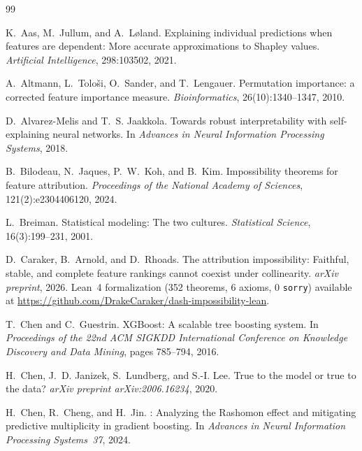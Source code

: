 \documentclass[11pt]{article}
\begin{document}
\begin{thebibliography}{99}

K.~Aas, M.~Jullum, and A.~L{\o}land.
\newblock Explaining individual predictions when features are dependent:
  More accurate approximations to {S}hapley values.
\newblock \emph{Artificial Intelligence}, 298:103502, 2021.

A.~Altmann, L.~Tolo{\v{s}}i, O.~Sander, and T.~Lengauer.
\newblock Permutation importance: a corrected feature importance measure.
\newblock \emph{Bioinformatics}, 26(10):1340--1347, 2010.

D.~Alvarez-Melis and T.~S. Jaakkola.
\newblock Towards robust interpretability with self-explaining neural networks.
\newblock In \emph{Advances in Neural Information Processing Systems}, 2018.

B.~Bilodeau, N.~Jaques, P.~W.~Koh, and B.~Kim.
\newblock Impossibility theorems for feature attribution.
\newblock \emph{Proceedings of the National Academy of Sciences},
  121(2):e2304406120, 2024.

L.~Breiman.
\newblock Statistical modeling: The two cultures.
\newblock \emph{Statistical Science}, 16(3):199--231, 2001.

D.~Caraker, B.~Arnold, and D.~Rhoads.
\newblock The attribution impossibility: Faithful, stable, and complete
  feature rankings cannot coexist under collinearity.
\newblock \emph{arXiv preprint}, 2026. Lean~4 formalization (352 theorems, 6 axioms, 0 \texttt{sorry})
  available at \url{https://github.com/DrakeCaraker/dash-impossibility-lean}.

T.~Chen and C.~Guestrin.
\newblock XGBoost: A scalable tree boosting system.
\newblock In \emph{Proceedings of the 22nd ACM SIGKDD International Conference
  on Knowledge Discovery and Data Mining}, pages 785--794, 2016.

H.~Chen, J.~D. Janizek, S.~Lundberg, and S.-I. Lee.
\newblock True to the model or true to the data?
\newblock \emph{arXiv preprint arXiv:2006.16234}, 2020.

H.~Chen, R.~Cheng, and H.~Jin.
: Analyzing the {R}ashomon effect and mitigating
  predictive multiplicity in gradient boosting.
\newblock In \emph{Advances in Neural Information Processing Systems~37}, 2024.


\end{thebibliography}
\end{document}
